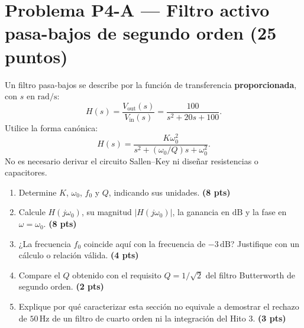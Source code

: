 \documentclass[10pt, a4paper]{article}
\begin{document}
\section*{Problema P4-A --- Filtro activo pasa-bajos de segundo orden (25 puntos)}

Un filtro pasa-bajos se describe por la función de transferencia \textbf{proporcionada}, con $s$ en $\mathrm{rad/s}$:
\[H(s) = \frac{V_{\mathrm{out}}(s)}{V_{\mathrm{in}}(s)} = \frac{100}{s^2 + 20s + 100}.\]
Utilice la forma canónica:
\[H(s) = \frac{K\omega_0^2}{s^2 + (\omega_0/Q)s + \omega_0^2}.\]
No es necesario derivar el circuito Sallen--Key ni diseñar resistencias o capacitores.

\begin{center}
\end{center}

\begin{enumerate}
    \renewcommand{\labelenumi}{(\alph{enumi})}
    \setlength{\itemsep}{2pt}
    \item Determine $K$, $\omega_0$, $f_0$ y $Q$, indicando sus unidades. \hfill \textbf{(8 pts)}
    \item Calcule $H(j\omega_0)$, su magnitud $\vert{}H(j\omega_0)\vert{}$, la ganancia en $\mathrm{dB}$ y la fase en $\omega = \omega_0$. \hfill \textbf{(8 pts)}
    \item ¿La frecuencia $f_0$ coincide aquí con la frecuencia de $-3\,\mathrm{dB}$? Justifique con un cálculo o relación válida. \hfill \textbf{(4 pts)}
    \item Compare el $Q$ obtenido con el requisito $Q = 1/\sqrt{2}$ del filtro Butterworth de segundo orden. \hfill \textbf{(2 pts)}
    \item Explique por qué caracterizar esta sección no equivale a demostrar el rechazo de $50\,\mathrm{Hz}$ de un filtro de cuarto orden ni la integración del Hito 3. \hfill \textbf{(3 pts)}
\end{enumerate}
\end{document}
